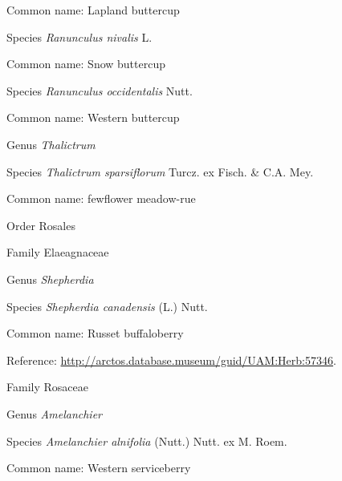 \documentclass[9pt, article]{memoir}
\begin{document}
\begin{multicols}{2}
Common name: Lapland buttercup

\vspace{6pt}\noindent\hspace{36pt}Species \textit{Ranunculus nivalis} L.


Common name: Snow buttercup

\vspace{6pt}\noindent\hspace{36pt}Species \textit{Ranunculus occidentalis} Nutt.


Common name: Western buttercup

\vspace{6pt}\noindent\hspace{30pt}Genus \textit{Thalictrum}


\vspace{6pt}\noindent\hspace{36pt}Species \textit{Thalictrum sparsiflorum} Turcz. ex Fisch. \& C.A. Mey.


Common name: fewflower meadow-rue

\vspace{6pt}\noindent\hspace{18pt}Order Rosales


\vspace{6pt}\noindent\hspace{24pt}Family Elaeagnaceae


\vspace{6pt}\noindent\hspace{30pt}Genus \textit{Shepherdia}


\vspace{6pt}\noindent\hspace{36pt}Species \textit{Shepherdia canadensis} (L.) Nutt.


Common name: Russet buffaloberry

Reference: 
\url{http://arctos.database.museum/guid/UAM:Herb:57346}.

\vspace{6pt}\noindent\hspace{24pt}Family Rosaceae


\vspace{6pt}\noindent\hspace{30pt}Genus \textit{Amelanchier}


\vspace{6pt}\noindent\hspace{36pt}Species \textit{Amelanchier alnifolia} (Nutt.) Nutt. ex M. Roem.


Common name: Western serviceberry


\end{multicols}
\end{document}
